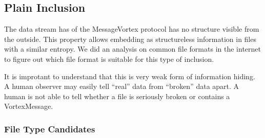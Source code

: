 
\subsection{Plain Inclusion}
The data stream has of the MessageVortex protocol has no structure visible from the outside. This property allows embedding as structureless information in files with a similar entropy. We did an analysis on common file formats in the internet to figure out which file format is suitable for this type of inclusion.

It is improtant to understand that this is very weak form of information hiding. A human observer may easily tell ``real'' data from ``broken'' data apart. A human is not able to tell whether a file is seriously broken or contains a VortexMessage.

\subsubsection{File Type Candidates}

